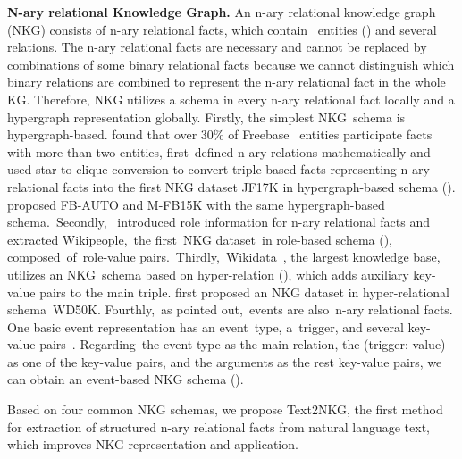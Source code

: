\documentclass{article} \usepackage{iclr2024_conference,times}
\begin{document}
\textbf{N-ary relational Knowledge Graph. }
An n-ary relational knowledge graph (NKG) consists of n-ary relational facts, which contain  entities () and several relations. The n-ary relational facts are necessary and cannot be replaced by combinations of some binary relational facts because we cannot distinguish which binary relations are combined to represent the n-ary relational fact in the whole KG. Therefore, NKG utilizes a schema in every n-ary relational fact locally and a hypergraph representation globally. 
Firstly, the simplest NKG schema is hypergraph-based. \cite{m-TransH} found that over 30\% of Freebase~\citep{Freebase} entities participate facts with more than two entities, first defined n-ary relations mathematically and used star-to-clique conversion to convert triple-based facts representing n-ary relational facts into the first NKG dataset JF17K in hypergraph-based schema (). \cite{HypE} proposed FB-AUTO and M-FB15K with the same hypergraph-based schema. Secondly, \cite{NaLP} introduced role information for n-ary relational facts and extracted Wikipeople, the first NKG dataset in role-based schema (), composed of role-value pairs. Thirdly, Wikidata~\citep{Wikidata}, the largest knowledge base, utilizes an NKG schema based on hyper-relation (), which adds auxiliary key-value pairs to the main triple. \cite{StarE} first proposed an NKG dataset in hyper-relational schema WD50K. Fourthly, as \cite{EventSurvey} pointed out, events are also n-ary relational facts. One basic event representation has an event type, a trigger, and several key-value pairs~\citep{Text2Event}. Regarding the event type as the main relation, the (trigger: value) as one of the key-value pairs, and the arguments as the rest key-value pairs, we can obtain an event-based NKG schema ().

Based on four common NKG schemas, we propose Text2NKG, the first method for extraction of structured n-ary relational facts from natural language text, which improves NKG representation and application.
\end{document}
